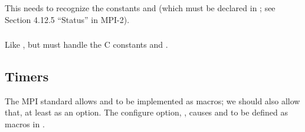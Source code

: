 \documentclass{article}
\begin{document}

\subsubsection{}
This needs to recognize the constants  and
 (which must be declared in ; see
Section 4.12.5 ``Status'' in MPI-2).  

\subsubsection{}
Like , but must handle the C constants
 and .

\subsection{Timers}
\label{sec:timer}
The MPI standard allows  and  to be
implemented as macros; we should also allow that, at least as an
option.  
The configure option, , causes
 and  to be defined as macros in
. 
\end{document}
